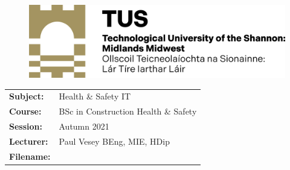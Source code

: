 \documentclass[a4paper, 10pt]{article}
\begin{document}
\lstset{language=HTML,
				basicstyle=\small,
				breaklines=true,
        numbers=left,
        numberstyle=\tiny,
        showstringspaces=false,
        aboveskip=-20pt,
        frame=leftline
        }


\begin{figure}
	\centering
	\includegraphics[width=0.5\linewidth]{./img/TUSlogo}
\end{figure}


\begin{tabularx}{\textwidth}{ |l|X| }
	\hline
	
	\textbf{Subject:} & Health \& Safety IT\\
	\textbf{Course:} & BSc in Construction Health \& Safety\\
	\textbf{Session:} & Autumn 2021\\
	\textbf{Lecturer:} & Paul Vesey \footnotesize{BEng, MIE, HDip}\\
	\textbf{Filename:} & \currfilebase\\
	\hline
\end{tabularx}
\end{document}
